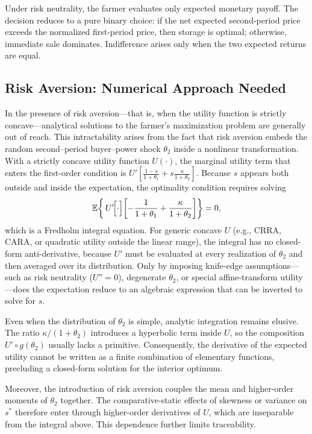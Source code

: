 \noindent Under risk neutrality, the farmer evaluates only expected monetary payoff. The decision reduces to a pure binary choice: if the net expected second-period price exceeds the normalized first-period price, then storage is optimal; otherwise, immediate sale dominates. Indifference arises only when the two expected returns are equal.


\subsection{Risk Aversion: Numerical Approach Needed}
\noindent In the presence of risk aversion---that is, when the utility function is strictly concave---analytical solutions to the farmer's maximization problem are generally out of reach. This intractability arises from the fact that risk aversion embeds the random second--period buyer–power shock $\theta_2$ inside a nonlinear transformation.  With a strictly concave utility function $U(\cdot)$, the marginal utility term that enters the first-order condition is $U'\!\left[\frac{1-s}{1+\theta_1}+ s\frac{\kappa}{1+\theta_2}\right]$.  Because $s$ appears both outside and inside the expectation, the optimality condition requires solving
$$
\mathbb{E}\!\left\{\,U'\!\Bigl[\cdot\Bigr]\!\left[-\frac{1}{1+\theta_1}+\frac{\kappa}{1+\theta_2}\right]\right\}=0,
$$
which is a Fredholm integral equation. For generic concave $U$ (e.g., CRRA, CARA, or quadratic utility outside the linear range), the integral has no closed-form anti-derivative, because $U'$ must be evaluated at every realization of $\theta_2$ and then averaged over its distribution. Only by imposing knife-edge assumptions---such as risk neutrality ($U''=0$), degenerate $\theta_2$, or special affine-transform utility---does the expectation reduce to an algebraic expression that can be inverted to solve for $s$.

Even when the distribution of $\theta_2$ is simple, analytic integration remains elusive. The ratio $\kappa/(1+\theta_2)$ introduces a hyperbolic term inside $U$, so the composition $U'\circ g(\theta_2)$ usually lacks a primitive.  Consequently, the derivative of the expected utility cannot be written as a finite combination of elementary functions, precluding a closed-form solution for the interior optimum. 

Moreover, the introduction of risk aversion couples the mean and higher-order moments of $\theta_2$ together. The comparative-static effects of skewness or variance on $s^{*}$ therefore enter through higher-order derivatives of $U$, which are inseparable from the integral above.  This dependence further limits traceability.


